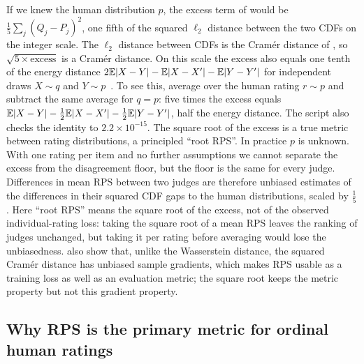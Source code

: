 If we knew the human distribution $p$, the excess term of  would be $\frac15\sum_j(Q_j-P_j)^2$, one fifth of the squared $\ell_2$ distance between the two CDFs on the integer scale.
The $\ell_2$ distance between CDFs is the Cramér distance of \citet{bellemare2017cramer}, so $\sqrt{5\times\text{excess}}$ is a Cramér distance.
On this scale the excess also equals one tenth of the energy distance $2\mathbb{E}|X-Y|-\mathbb{E}|X-X'|-\mathbb{E}|Y-Y'|$ for independent draws $X\sim q$ and $Y\sim p$~\citep{szekely2013energy}.
To see this, average  over the human rating $r\sim p$ and subtract the same average for $q=p$: five times the excess equals $\mathbb{E}|X-Y|-\tfrac12\mathbb{E}|X-X'|-\tfrac12\mathbb{E}|Y-Y'|$, half the energy distance.
The script also checks the identity to $2.2\times10^{-15}$.
The square root of the excess is a true metric between rating distributions, a principled ``root RPS''.
In practice $p$ is unknown.
With one rating per item and no further assumptions we cannot separate the excess from the disagreement floor, but the floor is the same for every judge.
Differences in mean RPS between two judges are therefore unbiased estimates of the differences in their squared CDF gaps to the human distributions, scaled by $\frac15$.
Here ``root RPS'' means the square root of the excess, not of the observed individual-rating loss: taking the square root of a mean RPS leaves the ranking of judges unchanged, but taking it per rating before averaging would lose the unbiasedness.
\citet{bellemare2017cramer} also show that, unlike the Wasserstein distance, the squared Cramér distance has unbiased sample gradients, which makes RPS usable as a training loss as well as an evaluation metric; the square root keeps the metric property but not this gradient property.

\subsection{Why RPS is the primary metric for ordinal human ratings}
\label{app:rps-why}

